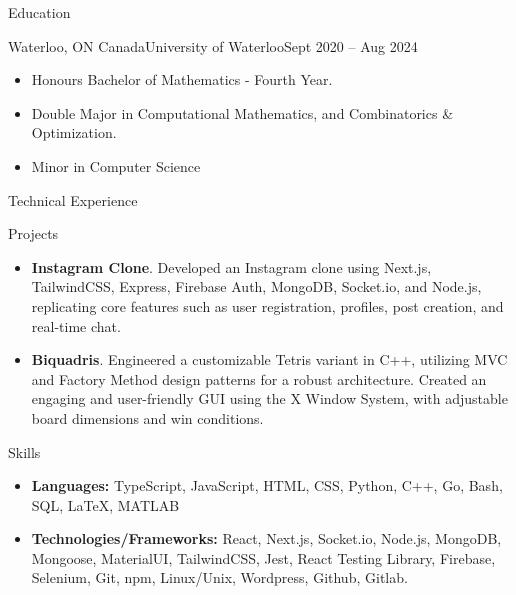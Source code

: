\documentclass[]{mcdowellcv}
\begin{document}
	\begin{cvsection}{Education}
		\begin{cvsubsection}{Waterloo, ON Canada}{University of Waterloo}{Sept 2020 -- Aug 2024}
			\begin{itemize}
				\item Honours Bachelor of Mathematics - Fourth Year.
				\item Double Major in Computational Mathematics, and Combinatorics \& Optimization.
				\item Minor in Computer Science
			\end{itemize}
		\end{cvsubsection}
	\end{cvsection}
	
	\begin{cvsection}{Technical Experience}
		\begin{cvsubsection}{Projects}{}{}
			\begin{itemize}
				\item \textbf{Instagram Clone}. Developed an Instagram clone using Next.js, TailwindCSS, Express, Firebase Auth, MongoDB, Socket.io, and Node.js, replicating core features such as user registration, profiles, post creation, and real-time chat.
				\item \textbf{Biquadris}. Engineered a customizable Tetris variant in C++, utilizing MVC and Factory Method design patterns for a robust architecture. Created an engaging and user-friendly GUI using the X Window System, with adjustable board dimensions and win conditions.
			\end{itemize}
		\end{cvsubsection}
	\end{cvsection}
	
	
	\begin{cvsection}{Skills}
		\begin{cvsubsection}{}{}{}	
			\begin{itemize}
				\item \textbf{Languages:} TypeScript, JavaScript, HTML, CSS, Python, C++, Go, Bash, SQL, LaTeX, MATLAB
				\item \textbf{Technologies/Frameworks:} React, Next.js, Socket.io, Node.js, MongoDB, Mongoose, MaterialUI, TailwindCSS, Jest, React Testing Library, Firebase, Selenium, Git, npm, Linux/Unix, Wordpress, Github, Gitlab.
			\end{itemize}
		\end{cvsubsection}
	\end{cvsection}
	
\end{document}
